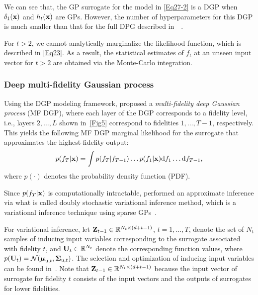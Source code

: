 \documentclass[iicol,sn-basic]{sn-jnl}%
\begin{document}
We can see that, the GP surrogate for the model in \cref{Eq27-2} is a DGP when $\delta_1(\bf x)$ and $h_{t}(\bf x)$ are GPs.
However, the number of hyperparameters for this DGP is much smaller than that for the full DPG described in~~\citep{Perdikaris2017}. 
  
For $t>2$, we cannot analytically marginalize the likelihood function, which is described in \cref{Eq23}.
As a result, the statistical estimates of $f_{t}$ at an unseen input vector for $t>2$ are obtained via the Monte-Carlo integration.

\subsubsection{Deep multi-fidelity Gaussian process}\label{Sec453}

Using the DGP modeling framework, \cite{Cutajar2019} proposed a \textit{multi-fidelity deep Gaussian process} (MF DGP),
where each layer of the DGP corresponds to a fidelity level, i.e., layers $2,\dots,L$ shown in~\cref{Fig5}
correspond to fidelities $1,\dots,T-1$, respectively.
This yields the following MF DGP marginal likelihood for the surrogate that approximates the highest-fidelity output:
\begin{equation}\label{Eq23}
	p(f_{T}|{\bf x}) = \int p(f_{T}|f_{T-1})\dots p(f_{1}|{\bf x}) \text{d}f_{1} \dots \text{d}f_{T-1},
\end{equation}
where $p(\cdot)$ denotes the probability density function (PDF).

Since $p(f_{T}|{\bf x})$ is computationally intractable, \cite{Cutajar2019} performed an approximate inference via what is called doubly stochastic variational inference method, which is a variational inference technique using sparse GPs~\citep{Salimbeni2017}.

For variational inference, let  ${\bf Z}_{t-1} \in \mathbb{R}^{N_t \times {(d+t-1)}}$, $t=1,\dots,T$, denote the set of $N_t$ samples of inducing input variables corresponding to the surrogate associated with fidelity $t$, and ${\bf U}_{t} \in \mathbb{R}^{N_t}$ denote the corresponding function values, where $p({\bf U}_{t}) = \mathcal{N}({\boldsymbol \mu}_{\text{u},t},{\boldsymbol \Sigma}_{\text{u},t})$.
The selection and optimization of inducing input variables can be found in~\cite{Titsias2009}.
Note that ${\bf Z}_{t-1} \in \mathbb{R}^{N_t \times {(d+t-1)}}$ because the input vector of surrogate for fidelity $t$ consists of the input vectors and the outputs of surrogates for lower fidelities.
\end{document}

